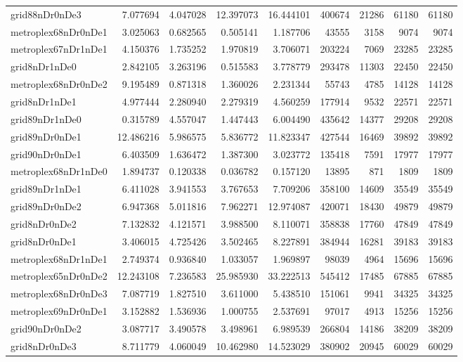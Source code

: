 \begin{longtable}{|l|r|r|r|r|r|r|r|r|}
grid88nDr0nDe3 & 7.077694 & 4.047028 & 12.397073 & 16.444101 & 400674 & 21286 & 61180 & 61180 \\
metroplex68nDr0nDe1 & 3.025063 & 0.682565 & 0.505141 & 1.187706 & 43555 & 3158 & 9074 & 9074 \\
metroplex67nDr1nDe1 & 4.150376 & 1.735252 & 1.970819 & 3.706071 & 203224 & 7069 & 23285 & 23285 \\
grid8nDr1nDe0 & 2.842105 & 3.263196 & 0.515583 & 3.778779 & 293478 & 11303 & 22450 & 22450 \\
metroplex68nDr0nDe2 & 9.195489 & 0.871318 & 1.360026 & 2.231344 & 55743 & 4785 & 14128 & 14128 \\
grid8nDr1nDe1 & 4.977444 & 2.280940 & 2.279319 & 4.560259 & 177914 & 9532 & 22571 & 22571 \\
grid89nDr1nDe0 & 0.315789 & 4.557047 & 1.447443 & 6.004490 & 435642 & 14377 & 29208 & 29208 \\
grid89nDr0nDe1 & 12.486216 & 5.986575 & 5.836772 & 11.823347 & 427544 & 16469 & 39892 & 39892 \\
grid90nDr0nDe1 & 6.403509 & 1.636472 & 1.387300 & 3.023772 & 135418 & 7591 & 17977 & 17977 \\
metroplex68nDr1nDe0 & 1.894737 & 0.120338 & 0.036782 & 0.157120 & 13895 & 871 & 1809 & 1809 \\
grid89nDr1nDe1 & 6.411028 & 3.941553 & 3.767653 & 7.709206 & 358100 & 14609 & 35549 & 35549 \\
grid89nDr0nDe2 & 6.947368 & 5.011816 & 7.962271 & 12.974087 & 420071 & 18430 & 49879 & 49879 \\
grid8nDr0nDe2 & 7.132832 & 4.121571 & 3.988500 & 8.110071 & 358838 & 17760 & 47849 & 47849 \\
grid8nDr0nDe1 & 3.406015 & 4.725426 & 3.502465 & 8.227891 & 384944 & 16281 & 39183 & 39183 \\
metroplex68nDr1nDe1 & 2.749374 & 0.936840 & 1.033057 & 1.969897 & 98039 & 4964 & 15696 & 15696 \\
metroplex65nDr0nDe2 & 12.243108 & 7.236583 & 25.985930 & 33.222513 & 545412 & 17485 & 67885 & 67885 \\
metroplex68nDr0nDe3 & 7.087719 & 1.827510 & 3.611000 & 5.438510 & 151061 & 9941 & 34325 & 34325 \\
metroplex69nDr0nDe1 & 3.152882 & 1.536936 & 1.000755 & 2.537691 & 97017 & 4913 & 15256 & 15256 \\
grid90nDr0nDe2 & 3.087717 & 3.490578 & 3.498961 & 6.989539 & 266804 & 14186 & 38209 & 38209 \\
grid8nDr0nDe3 & 8.711779 & 4.060049 & 10.462980 & 14.523029 & 380902 & 20945 & 60029 & 60029 \\

\end{longtable}
